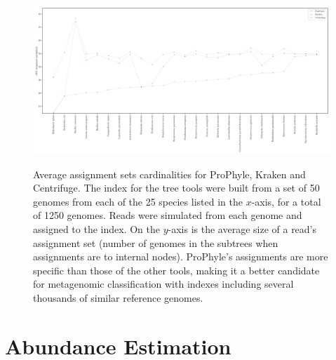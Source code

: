 \begin{figure}
  \caption{Average assignment sets cardinalities for ProPhyle, Kraken and Centrifuge. The index for the tree tools were built from a set of 50 genomes from each of the 25 species listed in the $x$-axis, for a total of 1250 genomes. Reads were simulated from each genome and assigned to the index. On the $y$-axis is the average size of a read's assignment set (number of genomes in the subtrees when assignments are to internal nodes). ProPhyle's assignments are more specific than those of the other tools, making it a better candidate for metagenomic classification with indexes including several thousands of similar reference genomes.}
  \centering
    \includegraphics[width=1\textwidth]{Figures/mult_ass.pdf}
  \label{fig:mult_ass}
\end{figure}

\section{Abundance Estimation}

